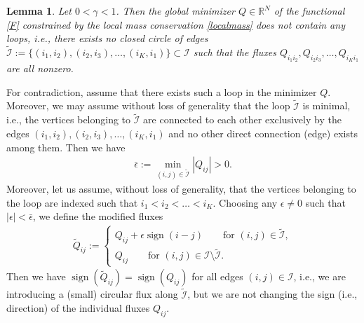 \documentclass{article}
\numberwithin{equation}{section}
\newtheorem{lemma}{Lemma}%
\def\begproof{\noindent{\bf Proof: }}
\newcommand{\R}{\mathbb{R}}
\newcommand{\eps}{\epsilon}
\newcommand{\sign}[0]{\operatorname{sign}}
\def\[{\begin{eqnarray*}}
\def\]{\end{eqnarray*}}
\begin{document}
\begin{lemma}\label{lem:treeF}
Let $0 < \gamma < 1$.
Then the global minimizer $Q\in\R^N$ of the functional \eqref{F} constrained by the local mass conservation \eqref{localmass}
does not contain any loops, i.e., there exists no closed circle of edges $\widetilde{\mathcal{I}} := \{ (i_1,i_2), (i_2,i_3), \ldots, (i_K, i_1) \} \subset \mathcal{I}$
such that the fluxes $Q_{i_1 i_2}, Q_{i_2 i_3}, \dots, Q_{i_K i_1}$ are all nonzero.
\end{lemma}

\begproof
For contradiction, assume that there exists such a loop in the minimizer $Q$.
Moreover, we may assume without loss of generality that the loop $\widetilde{\mathcal{I}}$ is minimal,
i.e., the vertices belonging to $\widetilde{\mathcal{I}}$ are connected to each other exclusively
by the edges $(i_1,i_2), (i_2,i_3), \ldots, (i_K, i_1)$ and no other direct connection (edge) exists among them.
Then we have
\[
   \bar \eps := \min_{(i,j)\in\widetilde{\mathcal{I}}} |Q_{ij}| > 0.
\]
Moreover, let us assume, without loss of generality, that the vertices belonging to the loop
are indexed such that $i_1 < i_2 < \dots < i_K$.
Choosing any $\eps\neq 0$ such that $|\eps|<\bar\eps$, we define the modified fluxes
\begin{align}
   \widetilde Q_{ij} := \left\{ \begin{aligned}
      Q_{ij} + \eps\sign(i-j) \qquad\mbox{for } (i,j)\in\widetilde{\mathcal{I}},\\
      Q_{ij}\qquad\mbox{for } (i,j)\in \mathcal{I}\setminus \widetilde{\mathcal{I}}.
      \end{aligned} \right.
\end{align}
Then we have $\sign(\widetilde Q_{ij}) = \sign(Q_{ij})$ for all edges $(i,j)\in \mathcal{I}$,
i.e., we are introducing a (small) circular flux along $\widetilde{\mathcal{I}}$, but we are
not changing the sign (i.e., direction) of the individual fluxes $Q_{ij}$.
\end{document}
